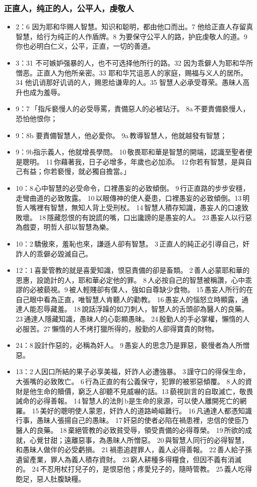 \subsubsection{正直人，纯正的人，公平人，虔敬人}
\begin{itemize}
\itemsep-.45em 
\item 2：6 因为耶和华赐人智慧。知识和聪明，都由他口而出。7 他给正直人存留真智慧，给行为纯正的人作盾牌。8 为要保守公平人的路，护庇虔敬人的道。9 你也必明白仁义，公平，正直，一切的善道。
\item 3：31 不可嫉妒强暴的人，也不可选择他所行的路。32 因为乖僻人为耶和华所憎恶。正直人为他所亲密。33 耶和华咒诅恶人的家庭，赐福与义人的居所。34 他讥诮那好讥诮的人，赐恩给谦卑的人。35 智慧人必承受尊荣。愚昧人高升也成为羞辱。
\item 9：7 「指斥褻慢人的必受辱罵，責備惡人的必被玷汙。 8a 不要責備褻慢人，恐怕他恨你；
\item 9：8b 要責備智慧人，他必愛你。 9a 教導智慧人，他就越發有智慧；
\item 9：9b指示義人，他就增長學問。 10 敬畏耶和華是智慧的開端，認識至聖者便是聰明。 11 你藉著我，日子必增多，年歲也必加添。 12 你若有智慧，是與自己有益；你若褻慢，就必獨自擔當。」
\item 10：8 心中智慧的必受命令，口裡愚妄的必致傾倒。 9 行正直路的步步安穩，走彎曲道的必致敗露。  10 以眼傳神的使人憂患，口裡愚妄的必致傾倒。13 明哲人嘴裡有智慧，無知人背上受刑杖。 14 智慧人積存知識，愚妄人的口速致敗壞。 18 隱藏怨恨的有說謊的嘴，口出讒謗的是愚妄的人。 23 愚妄人以行惡為戲耍，明哲人卻以智慧為樂。
\item 10：2 驕傲來，羞恥也來，謙遜人卻有智慧。 3 正直人的純正必引導自己，奸詐人的乖僻必毀滅自己。
\item 12：1 喜愛管教的就是喜愛知識，恨惡責備的卻是畜類。 2 善人必蒙耶和華的恩惠，設詭計的人，耶和華必定他的罪。 8 人必按自己的智慧被稱讚，心中乖謬的必被藐視。9 被人輕賤卻有僕人，強如自尊缺少食物。 15 愚妄人所行的在自己眼中看為正直，唯智慧人肯聽人的勸教。 16 愚妄人的惱怒立時顯露，通達人能忍辱藏羞。 18 說話浮躁的如刀刺人，智慧人的舌頭卻為醫人的良藥。 23 通達人隱藏知識，愚昧人的心彰顯愚昧。 24 殷勤人的手必掌權，懶惰的人必服苦。27 懶惰的人不烤打獵所得的，殷勤的人卻得寶貴的財物。
\item 24：8 設計作惡的，必稱為奸人。 9 愚妄人的思念乃是罪惡，褻慢者為人所憎惡。
\item 13：2 人因口所結的果子必享美福，奸詐人必遭強暴。 3 謹守口的得保生命，大張嘴的必致敗亡。 6 行為正直的有公義保守，犯罪的被邪惡傾覆。 8 人的資財是他生命的贖價，窮乏人卻聽不見威嚇的話。13 藐視訓言的自取滅亡，敬畏誡命的必得善報。 14 智慧人的法則 b是生命的泉源，可以使人離開死亡的網羅。 15 美好的聰明使人蒙恩，奸詐人的道路崎嶇難行。 16 凡通達人都憑知識行事，愚昧人張揚自己的愚昧。 17 奸惡的使者必陷在禍患裡，忠信的使臣乃醫人的良藥。 18 棄絕管教的必致貧受辱，領受責備的必得尊榮。 19 所欲的成就，心覺甘甜；遠離惡事，為愚昧人所憎惡。 20 與智慧人同行的必得智慧，和愚昧人做伴的必受虧損。 21 禍患追趕罪人，義人必得善報。 22 善人給子孫遺留產業，罪人為義人積存資財。 23 窮人耕種多得糧食，但因不義有消滅的。 24 不忍用杖打兒子的，是恨惡他；疼愛兒子的，隨時管教。 25 義人吃得飽足，惡人肚腹缺糧。

\end{itemize}
